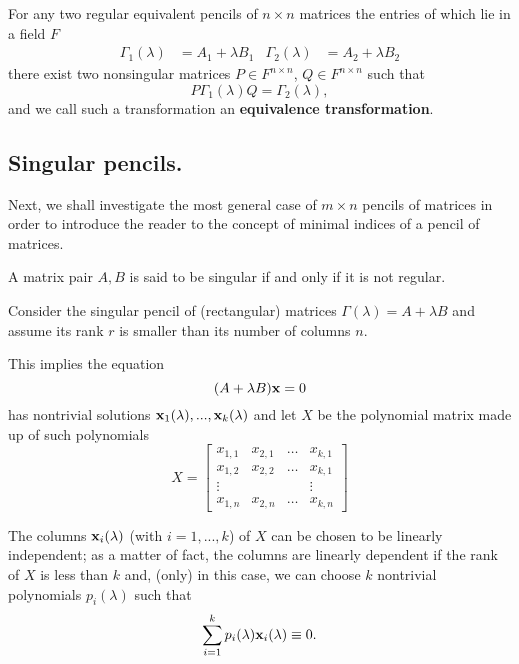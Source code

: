 \begin{lemma}
    For any two regular equivalent pencils of \(n \times n\) matrices the entries of which lie in a field \(F\)
    \begin{align*}
        \Gamma_{1}(\lambda) &= A_{1} + \lambda B_{1} &
        \Gamma_{2}(\lambda) &= A_{2} + \lambda B_{2}
    \end{align*}
    there exist two nonsingular matrices \(P \in F^{n \times n}\), \(Q \in F^{n \times n}\) such that
    \[
        P \Gamma_{1}(\lambda) Q = \Gamma_{2}(\lambda),
    \]
    and we call such a transformation an \textbf{equivalence transformation}.
\end{lemma}

\subsection*{Singular pencils.}
Next, we shall investigate the most general case of \(m \times n\) pencils of matrices in order to introduce
the reader to the concept of minimal indices of a pencil of matrices.
\begin{definition}
    A matrix pair \(A, B\) is said to be singular if and only if it is not regular.
\end{definition}

Consider the singular pencil of (rectangular) matrices \(\Gamma(\lambda) = A + \lambda B\) and assume its rank \(r\) is smaller
than its number of columns \(n\).

This implies the equation
\[
    (A + \lambda B) \vb{x} = 0
\]
has nontrivial solutions \(\vb{x}_{1}(\lambda), ..., \vb{x}_{k}(\lambda)\) and let \(X\) be the polynomial
matrix made up of such polynomials
\[
    X =
    \begin{bmatrix}
        x_{1, 1} & x_{2, 1} & \ldots & x_{k, 1} \\
        x_{1, 2} & x_{2, 2} & \ldots & x_{k, 1} \\
        \vdots   &          &        &   \vdots \\
        x_{1, n} & x_{2, n} & \ldots & x_{k, n}
    \end{bmatrix}
\]

The columns \(\vb{x}_{i}(\lambda)\) (with \(i = 1, ..., k\)) of \(X\) can be chosen to be linearly independent; as a matter of
fact, the columns are linearly dependent if the rank of \(X\) is less than \(k\) and, (only) in this case, we can
choose \(k\) nontrivial polynomials \(p_{i}(\lambda)\) such that
\[
    \sum_{i=1}^{k} p_{i}(\lambda) \vb{x}_{i}(\lambda) \equiv 0.
\]

